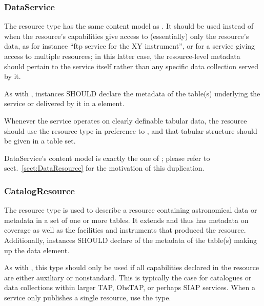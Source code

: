 \documentclass[11pt,a4paper]{ivoa}
\begin{document}
\begin{generated}
\begin{bigdescription}
\begin{description}
\end{description}


\end{bigdescription}\endgroup

\endgroup
\end{generated}


\subsubsection{DataService}

The  resource type has the same content model as
.  It should be used instead of
 when the resource's capabilities give
access to (essentially) only the resource's data, as for instance
``ftp service for the XY instrument'', or for a service giving access
to multiple resources; in this latter case, the resource-level
metadata should pertain to the service itself rather than any specific
data collection served by it.

As with , instances SHOULD
declare the metadata of the table(s) underlying the service or
delivered by it in a  element.

Whenever the service operates on clearly definable tabular
data, the resource should use the  resource type
in preference to , and that tabular structure
should be given in a table set.

DataService's content model is exactly the one of
; please refer to sect.~\ref{sect:DataResource}
for the motivation of this duplication.




\subsubsection{CatalogResource}
\label{sect:CatalogResource}


The  resource type is used to describe a
resource containing astronomical data or metadata in a set of one or
more tables.  It extends  and thus has metadata
on coverage as well as the facilities and instruments that produced the
resource.  Additionally,  instances SHOULD
declare of the metadata of the table(s) making up the data
 element.

As with , this type should only be used if all
capabilities declared in the resource are either auxiliary or
nonstandard.  This is typically the case for catalogues or data
collections within larger TAP, ObsTAP, or perhaps SIAP services.  When
a service only publishes a single resource, use the
 type.
\end{document}
